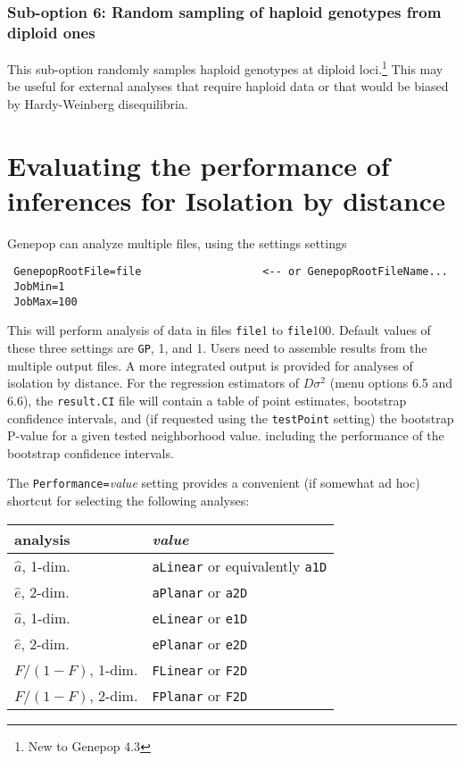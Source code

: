 \documentclass[12pt,]{book}
\let\rmarkdownfootnote\footnote%
\def\footnote{\protect\rmarkdownfootnote}
\begin{document}
\subsection{Sub-option 6: Random sampling of haploid genotypes from
diploid
ones}\label{sub-option-6-random-sampling-of-haploid-genotypes-from-diploid-ones}

This sub-option randomly samples haploid genotypes at diploid
loci.\footnote{New to Genepop 4.3} This may be useful for external
analyses that require haploid data or that would be biased by
Hardy-Weinberg disequilibria.

\chapter{Evaluating the performance of inferences for Isolation by
distance}\label{evaluating-the-performance-of-inferences-for-isolation-by-distance}

Genepop can analyze multiple files, using the settings settings

\begin{verbatim}
 GenepopRootFile=file                   <-- or GenepopRootFileName...
 JobMin=1
 JobMax=100
\end{verbatim}

   This will
perform analysis of data in files \texttt{file}1 to \texttt{file}100.
Default values of these three settings are \texttt{GP}, 1, and 1. Users
need to assemble results from the multiple output files. A more
integrated output is provided for analyses of isolation by distance. For
the regression estimators of \(D\sigma^2\) (menu options 6.5 and 6.6),
the \texttt{result.CI} file will contain a table of point estimates,
bootstrap confidence intervals, and (if requested using the
\texttt{testPoint} setting) the bootstrap P-value for a given tested
neighborhood value. including the performance of the bootstrap
confidence intervals.

The \texttt{Performance=}\emph{value} setting
provides a convenient (if somewhat ad hoc) shortcut for selecting the
following analyses:

\begin{longtable}[]{@{}ll@{}}
\toprule
analysis & \emph{value}\tabularnewline
\midrule
\endhead
\(\hat{a}\), 1-dim. & \texttt{aLinear} or equivalently
\texttt{a1D}\tabularnewline
\(\hat{e}\), 2-dim. & \texttt{aPlanar} or \texttt{a2D}\tabularnewline
\(\hat{a}\), 1-dim. & \texttt{eLinear} or \texttt{e1D}\tabularnewline
\(\hat{e}\), 2-dim. & \texttt{ePlanar} or \texttt{e2D}\tabularnewline
\(F/(1-F)\), 1-dim. & \texttt{FLinear} or \texttt{F2D}\tabularnewline
\(F/(1-F)\), 2-dim. & \texttt{FPlanar} or \texttt{F2D}\tabularnewline
\bottomrule
\end{longtable}
\end{document}
